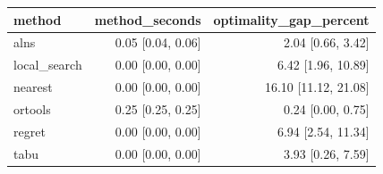 \begin{tabular}{lrr}
\toprule
method & method\_seconds & optimality\_gap\_percent \\
\midrule
alns & 0.05 [0.04, 0.06] & 2.04 [0.66, 3.42] \\
local\_search & 0.00 [0.00, 0.00] & 6.42 [1.96, 10.89] \\
nearest & 0.00 [0.00, 0.00] & 16.10 [11.12, 21.08] \\
ortools & 0.25 [0.25, 0.25] & 0.24 [0.00, 0.75] \\
regret & 0.00 [0.00, 0.00] & 6.94 [2.54, 11.34] \\
tabu & 0.00 [0.00, 0.00] & 3.93 [0.26, 7.59] \\
\bottomrule
\end{tabular}
